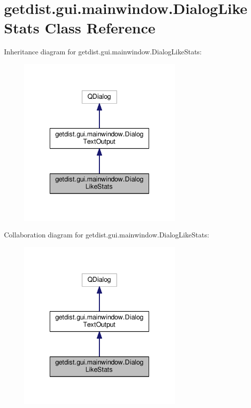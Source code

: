 \hypertarget{classgetdist_1_1gui_1_1mainwindow_1_1DialogLikeStats}{}\section{getdist.\+gui.\+mainwindow.\+Dialog\+Like\+Stats Class Reference}
\label{classgetdist_1_1gui_1_1mainwindow_1_1DialogLikeStats}


Inheritance diagram for getdist.\+gui.\+mainwindow.\+Dialog\+Like\+Stats\+:
\nopagebreak
\begin{figure}[H]
\begin{center}
\leavevmode
\includegraphics[width=228pt]{classgetdist_1_1gui_1_1mainwindow_1_1DialogLikeStats__inherit__graph}
\end{center}
\end{figure}


Collaboration diagram for getdist.\+gui.\+mainwindow.\+Dialog\+Like\+Stats\+:
\nopagebreak
\begin{figure}[H]
\begin{center}
\leavevmode
\includegraphics[width=228pt]{classgetdist_1_1gui_1_1mainwindow_1_1DialogLikeStats__coll__graph}
\end{center}
\end{figure}
